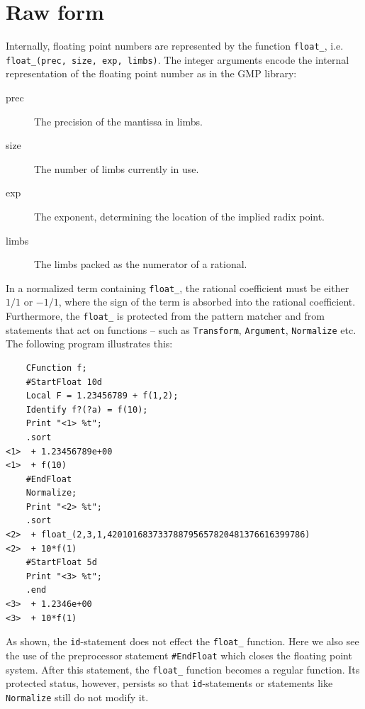 \section{Raw form}
\label{sec:float_raw}
Internally, floating point numbers are represented by the function \texttt{float\_}, 
i.e. \texttt{float\_(prec, size, exp, limbs)}. The integer arguments encode the 
internal representation of the floating point number as in the GMP library:
\begin{description}
\item[prec] The precision of the mantissa in limbs.
\item[size] The number of limbs currently in use.
\item[exp] The exponent, determining the location of the implied radix point.
\item[limbs] The limbs packed as the numerator of a \FORM{} rational. 
\end{description}
In a normalized term containing \texttt{float\_}, the rational coefficient must 
be either $1/1$ or $-1/1$, where the sign of the term is absorbed into the rational 
coefficient. 
Furthermore, the \texttt{float\_} is protected from the pattern matcher and from 
statements that act on functions -- such as \texttt{Transform}, \texttt{Argument}, 
\texttt{Normalize} etc.
The following program illustrates this:
%
\begin{verbatim}
    CFunction f;
    #StartFloat 10d
    Local F = 1.23456789 + f(1,2);
    Identify f?(?a) = f(10);
    Print "<1> %t";
    .sort
<1>  + 1.23456789e+00
<1>  + f(10)
    #EndFloat
    Normalize;
    Print "<2> %t";
    .sort
<2>  + float_(2,3,1,420101683733788795657820481376616399786)
<2>  + 10*f(1)
    #StartFloat 5d
    Print "<3> %t";
    .end
<3>  + 1.2346e+00
<3>  + 10*f(1)
\end{verbatim}
%
As shown, the \texttt{id}-statement does not effect the \texttt{float\_} function. 
Here we also see the use of the preprocessor statement \texttt{\#EndFloat} which closes 
the floating point system. After this statement, the \texttt{float\_} function becomes a 
regular function. Its protected status, however, persists so that \texttt{id}-statements 
or statements like \texttt{Normalize} still do not modify it. 
